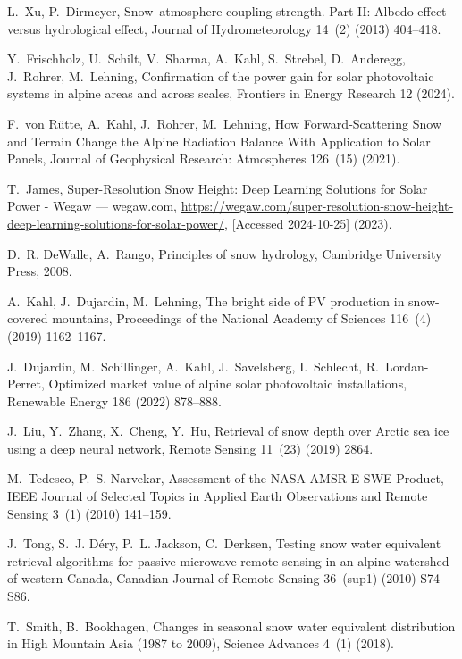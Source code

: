 \documentclass[preprint,12pt]{elsarticle}
\begin{document}
L.~Xu, P.~Dirmeyer, {Snow--atmosphere coupling strength. Part II: Albedo effect versus hydrological effect}, Journal of Hydrometeorology 14~(2) (2013) 404--418.

Y.~Frischholz, U.~Schilt, V.~Sharma, A.~Kahl, S.~Strebel, D.~Anderegg, J.~Rohrer, M.~Lehning, {Confirmation of the power gain for solar photovoltaic systems in alpine areas and across scales}, Frontiers in Energy Research 12 (2024).

F.~von R\"{u}tte, A.~Kahl, J.~Rohrer, M.~Lehning, {How Forward‐Scattering Snow and Terrain Change the Alpine Radiation Balance With Application to Solar Panels}, Journal of Geophysical Research: Atmospheres 126~(15) (2021).

T.~James, {S}uper-{R}esolution {S}now {H}eight: {D}eep {L}earning {S}olutions for {S}olar {P}ower - {W}egaw --- wegaw.com, \url{https://wegaw.com/super-resolution-snow-height-deep-learning-solutions-for-solar-power/}, [Accessed 2024-10-25] (2023).

D.~R. DeWalle, A.~Rango, Principles of snow hydrology, Cambridge University Press, 2008.

A.~Kahl, J.~Dujardin, M.~Lehning, {The bright side of PV production in snow-covered mountains}, Proceedings of the National Academy of Sciences 116~(4) (2019) 1162--1167.

J.~Dujardin, M.~Schillinger, A.~Kahl, J.~Savelsberg, I.~Schlecht, R.~Lordan-Perret, Optimized market value of alpine solar photovoltaic installations, Renewable Energy 186 (2022) 878–888.

J.~Liu, Y.~Zhang, X.~Cheng, Y.~Hu, {Retrieval of snow depth over Arctic sea ice using a deep neural network}, Remote Sensing 11~(23) (2019) 2864.

M.~Tedesco, P.~S. Narvekar, {Assessment of the NASA AMSR-E SWE Product}, IEEE Journal of Selected Topics in Applied Earth Observations and Remote Sensing 3~(1) (2010) 141–159.

J.~Tong, S.~J. Déry, P.~L. Jackson, C.~Derksen, {Testing snow water equivalent retrieval algorithms for passive microwave remote sensing in an alpine watershed of western Canada}, Canadian Journal of Remote Sensing 36~(sup1) (2010) S74–S86.

T.~Smith, B.~Bookhagen, {Changes in seasonal snow water equivalent distribution in High Mountain Asia (1987 to 2009)}, Science Advances 4~(1) (2018).
\end{document}
